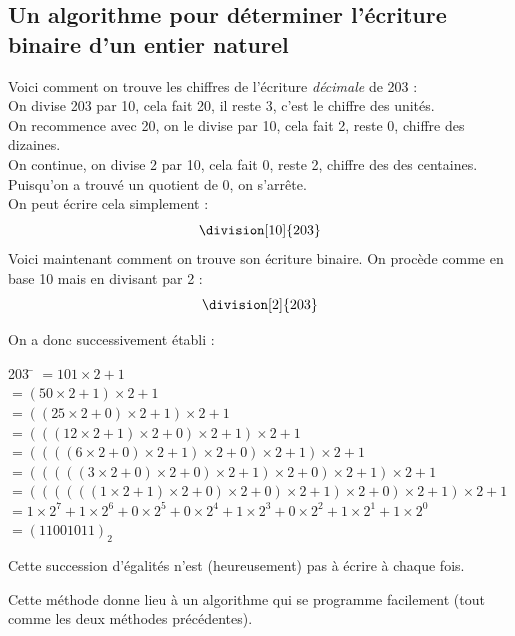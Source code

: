 \documentclass[a4paper,12pt,french]{book}
\begin{document}
\subsection{Un algorithme pour déterminer l'écriture binaire d'un entier naturel}
\begin{methode}
Voici comment on trouve les chiffres de l'écriture \textit{décimale} de 203 :\\

On divise 203 par 10, cela fait 20, il reste 3, c'est le chiffre des unités.\\
On recommence avec 20, on le divise par 10, cela fait 2, reste 0, chiffre des dizaines.\\
On continue, on divise 2 par 10, cela fait 0, reste 2, chiffre des des centaines.\\
Puisqu'on a trouvé un quotient de 0, on s'arrête.\\
On peut écrire cela simplement :
$$\division[10]{203}$$
Voici maintenant comment on trouve son écriture binaire. On procède comme en base 10 mais en divisant par 2 :
$$\division[2]{203}$$

On a donc successivement établi :
	\begin{tabbing}
	203	\= 	$=101\times 2 +1$	\\
		\>	$=(50\times 2 +1)\times 2+1  $	\\
		\>	$=((25\times 2 +0)\times 2 +1)\times 2+1  $	\\
		\>	$=(((12\times 2 +1)\times 2 +0)\times 2 +1)\times 2+1  $	\\
		\>	$=((((6\times 2 +0)\times 2 +1)\times 2 +0)\times 2 +1)\times 2+1  $	\\
		\>	$=(((((3\times 2 +0)\times 2 +0)\times 2 +1)\times 2 +0)\times 2 +1)\times 2+1  $	\\
		\>	$=((((((1\times 2 +1)\times 2 +0)\times 2 +0)\times 2 +1)\times 2 +0)\times 2 +1)\times 2+1  $	\\

		\>	$=1\times 2^7+1\times 2^6+0\times 2^5 + 0\times 2^4 +1\times 2^3+0\times 2^2 + 1\times 2^1+1\times
		2^0$\\
				\> $=(11001011)_2$
	\end{tabbing}
Cette succession d'égalités n'est (heureusement) pas à écrire à chaque fois.

\end{methode}

Cette méthode donne lieu à un algorithme qui se programme facilement (tout comme les deux méthodes précédentes).
\end{document}
